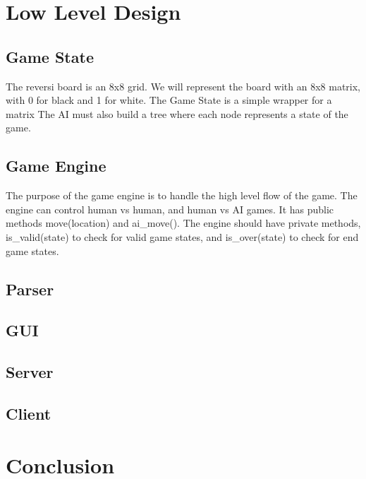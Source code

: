 \documentclass{article}
\begin{document}
\section{Low Level Design}

\subsection{Game State}
The reversi board is an 8x8 grid. We will represent the board with an 8x8 matrix, 
with 0 for black and 1 for white. The Game State is a simple wrapper for a matrix
The AI must also build a tree where each node represents a state of the game.    

\subsection{Game Engine}
The purpose of the game engine is to handle the high level flow of the game. The engine
can control human vs human, and human vs AI games. It has public methods move(location) and ai\_move().
The engine should have private methods, is\_valid(state) to check for valid game states, and is\_over(state)
to check for end game states. 

\subsection{Parser}
\subsection{GUI}
\subsection{Server}
\subsection{Client}



\section{Conclusion} %
\end{document}
